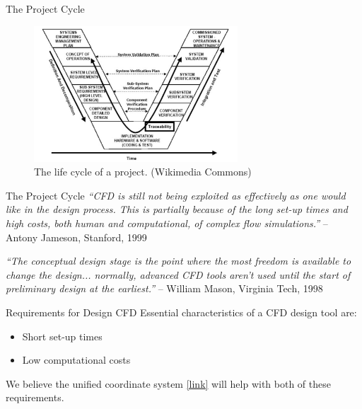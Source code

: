 \documentclass{beamer}
\begin{document}
\begin{frame}{The Project Cycle}
  \begin{figure}
    \includegraphics[height=2in]{Systems_Engineering_V_diagram.pdf}
    \caption{The life cycle of a project.
    (Wikimedia Commons)
}
  \end{figure}
\end{frame}

\begin{frame}{The Project Cycle}
  \emph{``CFD is still not being exploited as effectively as one would like
    in the design process. This is partially because of the long set-up
    times and high costs, both human and computational, of complex flow
  simulations.''}  -- Antony Jameson, Stanford, 1999 \vspace{.25in}

\emph{``The conceptual design stage is the point where the most 
freedom is available to change the design...
normally, 
advanced CFD tools aren't used until the start of preliminary 
design at the earliest.''} -- William Mason, Virginia Tech, 1998
\end{frame}

\begin{frame}{Requirements for Design CFD}
  Essential characteristics of a CFD design tool are:
  \begin{itemize}
  \item Short set-up times
  \item Low computational costs
  \end{itemize}
  \vspace{.25in}
  We believe the unified coordinate system 
  \href{http://www.youtube.com/watch?v=g-a9oGpKiEw}{[link]}
  will help with both of these requirements.
\end{frame}
\end{document}
